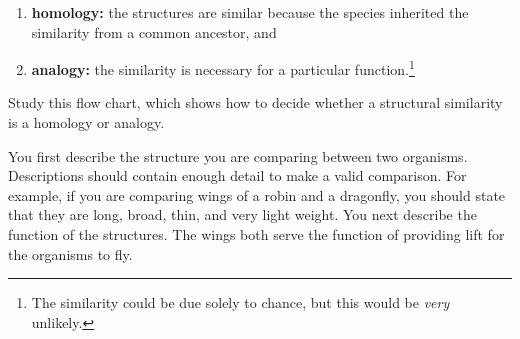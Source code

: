 \documentclass[12pt, hidelinks]{exam}
\begin{document}
\begin{enumerate}
	\item \textbf{homology:} the structures are similar because the species
inherited the similarity from a common ancestor, and

	\item \textbf{analogy:} the similarity is necessary for a particular function.\footnote{The similarity
could be due solely to chance, but this would be \emph{very}
unlikely.} 
\end{enumerate}

\bigskip

\begin{questions}
	
\question
Study this flow chart, which shows how to decide whether a structural similarity 
is a homology or analogy. 

\begin{center}


\end{center}

\bigskip

You first describe the structure you are comparing
between two organisms. Descriptions should contain enough detail to make
a valid comparison. For example, if you are comparing wings of a robin and a 
dragonfly, you should state that they are long, broad, thin, and very light weight.
You next describe the function of the structures. The wings both serve the
function of providing lift for the organisms to fly. 


\end{questions}
\end{document}
